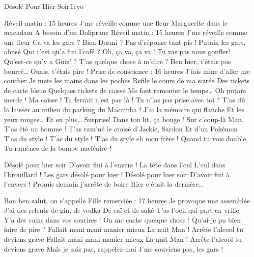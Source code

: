 \begin{Song}{Désolé Pour Hier Soir}{Tryo}
\begin{multicols}{2}
\begin{Verse}
Réveil matin : 15 heures
J'me réveille comme une fleur
Marguerite dans le macadam
A besoin d'un Doliprane
Réveil matin : 15 heures
J'me réveille comme une fleur
Ca va les gars ? Bien Dormi ?
Pas d'réponse tant pis !
Putain les gars, abusé
Qui c'est qu'a fini l'café ?
Oh, ça va, ça va !
Tu vas pas nous gonfler!
Qu'est-ce qu'y a Guiz' ?
T'as quelque chose à m'dire ?
Ben hier, t'étais pas bourré\dots
{}
Ouais, t'étais pire !
Prise de conscience : 16 heures
J'fais mine d'aller me coucher
Je mets les mains dans les poches
Refile le cours de ma soirée
Des tickets de carte bleue
Quelques tickets de caisse
Me font remonter le temps\dots
Oh putain merde ! Ma caisse !
Ta ferrari n'est pas là !
Tu n'las pas prise avec toi ?
T'as dû la laisser au milieu
du parking du Macumba !
J'ai la mémoire qui flanche
Et les yeux rouges\dots
{} Et en plus\dots
{} Surprise!
 Dans ton lit, ça bouge !
Sur c'coup-là Man,
T'as été un homme !
T'as ram'né le croisé d'Jackie, Sardou
Et d'un Pokémon
T'as du style ! T'as du style !
T'as du style eh mon frère !
Quand tu vois double,
Tu ramènes de la bombe nucléaire !
\end{Verse}
\begin{Chorus}
Désolé pour hier soir
D'avoir fini à l'envers !
La tête dans l'cul
L'cul dans l'brouillard !
Les gars désolé pour hier !
Désolé pour hier soir
D'avoir fini à l'envers !
Promis demain j'arrête de boire
Hier c'était la dernière\dots
\end{Chorus}
\begin{Verse}
Bon ben salut, on s'appelle
Fille remerciée : 17 heures
Je provoque une assemblée
J'ai des relents de gin, de vodka
De caï et de saké
T'as l'oeil qui part en vrille
Y'a des coins dans vos sourires !
On me cache quelque chose !
Qu'ai-je pu bien faire de pire ?
Fallait mani mani manier mieux
La nuit Man !
Arrête l'alcool tu deviens grave
Fallait mani mani manier mieux
La nuit Man !
Arrête l'alcool tu deviens grave
Mais je sais pas, rappelez-moi
J'me souviens pas, les gars !

\end{Verse}
\end{multicols}
\end{Song}

